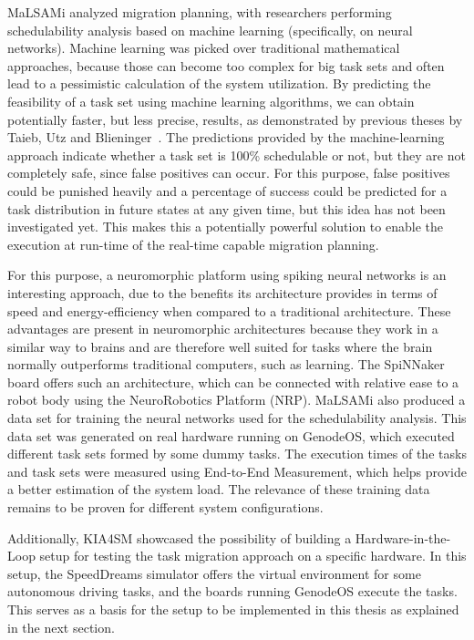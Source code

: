 MaLSAMi analyzed migration planning, with researchers performing schedulability analysis based on machine learning (specifically, on neural networks). Machine learning was picked over traditional mathematical approaches, because those can become too complex for big task sets and often lead to a pessimistic calculation of the system utilization. By predicting the feasibility of a task set using machine learning algorithms, we can obtain potentially faster, but less precise, results, as demonstrated by previous theses by Taieb, Utz and Blieninger~\parencite{taieb1, utz1, blieninger1}. The predictions provided by the machine-learning approach indicate whether a task set is 100\% schedulable or not, but they are not completely safe, since false positives can occur. For this purpose, false positives could be punished heavily and a percentage of success could be predicted for a task distribution in future states at any given time, but this idea has not been investigated yet. This makes this a potentially powerful solution to enable the execution at run-time of the real-time capable migration planning.

For this purpose, a neuromorphic platform using spiking neural networks is an interesting approach, due to the benefits its architecture provides in terms of speed and energy-efficiency when compared to a traditional architecture. These advantages are present in neuromorphic architectures because they work in a similar way to brains and are therefore well suited for tasks where the brain normally outperforms traditional computers, such as learning. The SpiNNaker board offers such an architecture, which can be connected with relative ease to a robot body using the NeuroRobotics Platform (NRP).
MaLSAMi also produced a data set for training the neural networks used for the schedulability analysis. This data set was generated on real hardware running on GenodeOS, which executed different task sets formed by some dummy tasks. The execution times of the tasks and task sets were measured using End-to-End Measurement, which helps provide a better estimation of the system load. The relevance of these training data remains to be proven for different system configurations.

Additionally, KIA4SM showcased the possibility of building a Hardware-in-the-Loop setup for testing the task migration approach on a specific hardware. In this setup, the SpeedDreams simulator offers the virtual environment for some autonomous driving tasks, and the boards running GenodeOS execute the tasks. This serves as a basis for the setup to be implemented in this thesis as explained in the next section.


